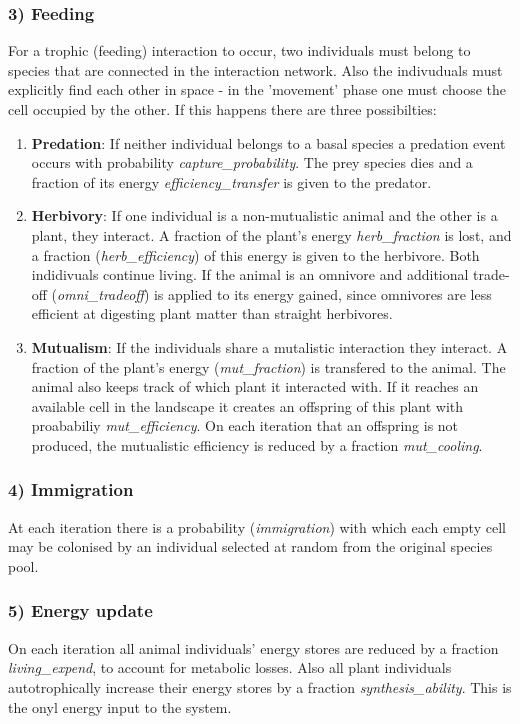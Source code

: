 \subsubsection*{3) Feeding}
For a trophic (feeding) interaction to occur, two individuals must belong to species that are connected in the interaction network. Also the indivuduals must explicitly find each other in space - in the 'movement' phase one must choose the cell occupied by the other. If this happens there are three possibilties:

\begin{enumerate}
	\item \textbf{Predation}: If neither individual belongs to a basal species a predation event occurs with probability \emph{capture\_probability}. The prey species dies and a fraction of its energy \emph{efficiency\_transfer} is given to the predator.
	\item \textbf{Herbivory}: If one individual is a non-mutualistic animal and the other is a plant, they interact. A fraction of the plant's energy \emph{herb\_fraction} is lost, and a fraction (\emph{herb\_efficiency}) of this energy is given to the herbivore. Both indidivuals continue living. If the animal is an omnivore and additional trade-off (\emph{omni\_tradeoff}) is applied to its energy gained, since omnivores are less efficient at digesting plant matter than straight herbivores.   
	\item \textbf{Mutualism}: If the individuals share a mutalistic interaction they interact. A fraction of the plant's energy (\emph{mut\_fraction}) is transfered to the animal. The animal also keeps track of which plant it interacted with. If it reaches an available cell in the landscape it creates an offspring of this plant with proababiliy \emph{mut\_efficiency}. On each iteration that an offspring is not produced, the mutualistic efficiency is reduced by a fraction \emph{mut\_cooling}.  
\end{enumerate}  
\subsubsection*{4) Immigration}
At each iteration there is a probability (\emph{immigration}) with which each empty cell may be colonised by an individual selected at random from the original species pool. 
\subsubsection*{5) Energy update}
On each iteration all animal individuals' energy stores are reduced by a fraction \emph{living\_expend}, to account for metabolic losses. Also all plant individuals autotrophically increase their energy stores by a fraction \emph{synthesis\_ability}. This is the onyl energy input to the system.

